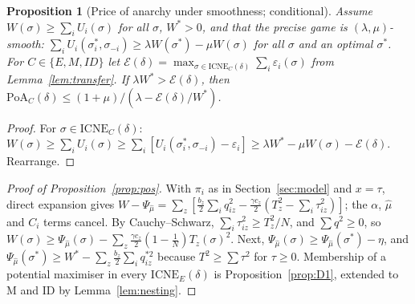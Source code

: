\documentclass[preprint,11pt]{elsarticle}
\newtheorem{proposition}[theorem]{Proposition}
\theoremstyle{definition}
\theoremstyle{remark}
\newcommand{\ICNE}{\mathrm{ICNE}}
\begin{document}
\begin{proposition}[Price of anarchy under smoothness; conditional]\label{prop:smooth}
Assume $W(\sigma)\ge\sum_iU_i(\sigma)$ for all $\sigma$, $W^*>0$, and that the precise game is $(\lambda,\mu)$-smooth: $\sum_iU_i(\sigma^*_i,\sigma_{-i})\ge\lambda W(\sigma^*)-\mu W(\sigma)$ for all $\sigma$ and an optimal $\sigma^*$. For $C\in\{E,M,ID\}$ let $\mathcal E(\delta)=\max_{\sigma\in\ICNE_C(\delta)}\sum_i\varepsilon_i(\sigma)$ from Lemma~\ref{lem:transfer}. If $\lambda W^*>\mathcal E(\delta)$, then $\mathrm{PoA}_C(\delta)\le(1+\mu)/(\lambda-\mathcal E(\delta)/W^*)$.
\end{proposition}
\begin{proof}
For $\sigma\in\ICNE_C(\delta)$: $W(\sigma)\ge\sum_iU_i(\sigma)\ge\sum_i[U_i(\sigma^*_i,\sigma_{-i})-\varepsilon_i]\ge\lambda W^*-\mu W(\sigma)-\mathcal E(\delta)$. Rearrange.
\end{proof}

\begin{proof}[Proof of Proposition~\ref{prop:pos}]
With $\pi_i$ as in Section~\ref{sec:model} and $x=\tau$, direct expansion gives $W-\Psi_{\hat\mu}=\sum_z[\tfrac{b_z}{2}\sum_iq_{iz}^2-\tfrac{\gamma c_z}{2}(T_z^2-\sum_i\tau_{iz}^2)]$; the $\alpha$, $\hat\mu$ and $C_i$ terms cancel. By Cauchy--Schwarz, $\sum_i\tau_{iz}^2\ge T_z^2/N$, and $\sum q^2\ge0$, so $W(\sigma)\ge\Psi_{\hat\mu}(\sigma)-\sum_z\tfrac{\gamma c_z}{2}(1-\tfrac1N)T_z(\sigma)^2$. Next, $\Psi_{\hat\mu}(\sigma)\ge\Psi_{\hat\mu}(\sigma^*)-\eta$, and $\Psi_{\hat\mu}(\sigma^*)\ge W^*-\sum_z\tfrac{b_z}{2}\sum_iq_{iz}^{*2}$ because $T^2\ge\sum\tau^2$ for $\tau\ge0$. Membership of a potential maximiser in every $\ICNE_E(\delta)$ is Proposition~\ref{prop:D1}, extended to M and ID by Lemma~\ref{lem:nesting}.
\end{proof}
\end{document}
